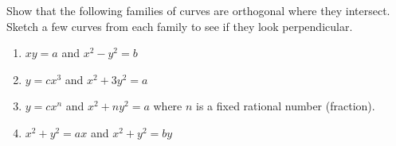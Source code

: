 
  \begin{ProblemSection}
    \begin{embeddedproblem}{}
      Show that the following families of curves are orthogonal where
      they intersect.  Sketch a few curves from each family to see if
      they look perpendicular.
      \begin{enumerate}[label={\bf{}(\alph*)}]{}
      \item $xy=a$ and $ {x}^{2} - {y}^{2} =b$
      \item $y=c {x} ^ {3}$ and ${x} ^ {2} +3 {y} ^ {2}
        =a$
      \item $y= c {x} ^ {n}$ and $ {x} ^ {2} +n {y} ^ {2}
        =a$ where $n$ is a fixed rational number (fraction).
      \item ${x} ^ {2} + {y} ^ {2} =ax$ and $          {x} ^ {2} + {y} ^ {2}   =by$
      \end{enumerate}
    \end{embeddedproblem}
  
  \end{ProblemSection}

